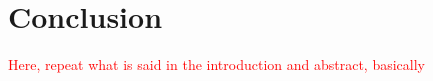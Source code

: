 \chapter{Conclusion}\label{conclusion}

\textcolor{red}{Here, repeat what is said in the introduction and abstract, basically}